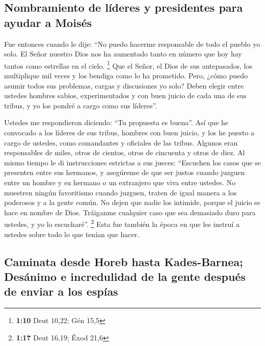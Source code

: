 \hypertarget{nombramiento-de-luxedderes-y-presidentes-para-ayudar-a-moisuxe9s}{%
\subsection{Nombramiento de líderes y presidentes para ayudar a
Moisés}\label{nombramiento-de-luxedderes-y-presidentes-para-ayudar-a-moisuxe9s}}

 Fue entonces cuando le dije: ``No puedo hacerme
responsable de todo el pueblo yo solo.  El Señor nuestro
Dios nos ha aumentado tanto en número que hoy hay tantos como estrellas
en el cielo. \footnote{\textbf{1:10} Deut 10,22; Gén 15,5}
 Que el Señor, el Dios de sus antepasados, los
multiplique mil veces y los bendiga como lo ha prometido.
 Pero, ¿cómo puedo asumir todos sus problemas, cargas y
discusiones yo solo?  Deben elegir entre ustedes hombres
sabios, experimentados y con buen juicio de cada una de sus tribus, y yo
los pondré a cargo como sus líderes''.

 Ustedes me respondieron diciendo: ``Tu propuesta es
buena''.  Así que he convocado a los líderes de sus
tribus, hombres con buen juicio, y los he puesto a cargo de ustedes,
como comandantes y oficiales de las tribus. Algunos eran responsables de
miles, otros de cientos, otros de cincuenta y otros de diez.
 Al mismo tiempo le di instrucciones estrictas a sus
jueces: ``Escuchen los casos que se presenten entre sus hermanos, y
asegúrense de que ser justos cuando juzguen entre un hombre y su hermano
o un extranjero que viva entre ustedes.  No muestren
ningún favoritismo cuando juzguen, traten de igual manera a los
poderosos y a la gente común. No dejen que nadie los intimide, porque el
juicio se hace en nombre de Dios. Tráiganme cualquier caso que sea
demasiado duro para ustedes, y yo lo escucharé''. \footnote{\textbf{1:17}
  Deut 16,19; Éxod 21,6}  Esta fue también la época en
que les instruí a ustedes sobre todo lo que tenían que hacer.

\hypertarget{caminata-desde-horeb-hasta-kades-barnea-desuxe1nimo-e-incredulidad-de-la-gente-despuuxe9s-de-enviar-a-los-espuxedas}{%
\subsection{Caminata desde Horeb hasta Kades-Barnea; Desánimo e
incredulidad de la gente después de enviar a los
espías}\label{caminata-desde-horeb-hasta-kades-barnea-desuxe1nimo-e-incredulidad-de-la-gente-despuuxe9s-de-enviar-a-los-espuxedas}}


